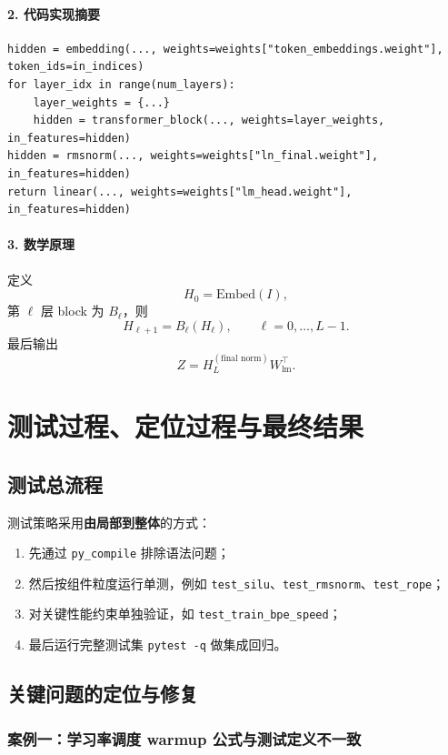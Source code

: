 \documentclass[UTF8,a4paper,11pt]{ctexart}
\begin{document}
\paragraph{2. 代码实现摘要}
\begin{lstlisting}
hidden = embedding(..., weights=weights["token_embeddings.weight"], token_ids=in_indices)
for layer_idx in range(num_layers):
    layer_weights = {...}
    hidden = transformer_block(..., weights=layer_weights, in_features=hidden)
hidden = rmsnorm(..., weights=weights["ln_final.weight"], in_features=hidden)
return linear(..., weights=weights["lm_head.weight"], in_features=hidden)
\end{lstlisting}

\paragraph{3. 数学原理}
定义
\[
H_0 = \mathrm{Embed}(I),
\]
第 \(\ell\) 层 block 为 \(B_\ell\)，则
\[
H_{\ell+1} = B_\ell(H_\ell), \qquad \ell=0,\dots,L-1.
\]
最后输出
\[
Z = H_L^{(\text{final norm})} W_{\text{lm}}^\top.
\]

\newpage
\section{测试过程、定位过程与最终结果}

\subsection{测试总流程}
测试策略采用\textbf{由局部到整体}的方式：
\begin{enumerate}[leftmargin=2em]
  \item 先通过 \texttt{py\_compile} 排除语法问题；
  \item 然后按组件粒度运行单测，例如 \texttt{test\_silu}、\texttt{test\_rmsnorm}、\texttt{test\_rope}；
  \item 对关键性能约束单独验证，如 \texttt{test\_train\_bpe\_speed}；
  \item 最后运行完整测试集 \texttt{pytest -q} 做集成回归。
\end{enumerate}

\subsection{关键问题的定位与修复}

\subsubsection{案例一：学习率调度 warmup 公式与测试定义不一致}
\end{document}
